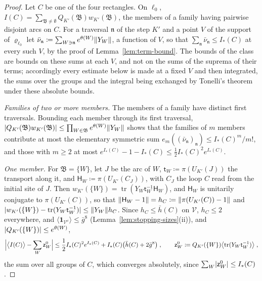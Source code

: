 \documentclass[11pt]{preprint}
\newcommand{\tr}{\operatorname{tr}}
\DeclarePairedDelimiter{\abs}{\lvert}{\rvert}
\DeclarePairedDelimiter{\norm}{\lVert}{\rVert}
\numberwithin{equation}{section}
\theoremstyle{definition}
\theoremstyle{remark}
\theoremstyle{plain}
\begin{document}
\begin{proof}
Let $C$ be one of the four rectangles. On $\ell_0$, $I(C) = \sum_{\mathfrak B \neq \emptyset}Q_{K'}(\mathfrak B)w_{K'}(\mathfrak B)$, the members of a family having pairwise disjoint arcs on $C$. For a traversal $\mathfrak n$ of the step $K'$ and a point $V$ of the support of $\varrho_{\ell_0}$ let $\bar\nu_{\mathfrak n} \coloneqq \sum_{W \ni \mathfrak n}e^{\theta(W)}\norm{Y_W}$, a function of $V$, so that $\sum_{\mathfrak n}\bar\nu_{\mathfrak n} \leq I_*(C)$ at every such $V$, by the proof of Lemma~\ref{lem:term-bound}. The bounds of the class are bounds on these sums at each $V$, and not on the sums of the suprema of their terms; accordingly every estimate below is made at a fixed $V$ and then integrated, the sums over the groups and the integral being exchanged by Tonelli's theorem under these absolute bounds.

\emph{Families of two or more members.} The members of a family have distinct first traversals. Bounding each member through its first traversal, $\abs{Q_{K'}(\mathfrak B)w_{K'}(\mathfrak B)} \leq \prod_{W \in \mathfrak B}e^{\theta(W)}\norm{Y_W}$ shows that the families of $m$ members contribute at most the elementary symmetric sum $e_m((\bar\nu_{\mathfrak n})_{\mathfrak n}) \leq I_*(C)^m/m!$, and those with $m \geq 2$ at most $e^{I_*(C)} - 1 - I_*(C) \leq \frac12I_*(C)^2e^{I_*(C)}$.

\emph{One member.} For $\mathfrak B = \{ W \}$, let $J$ be the arc of $W$, $\mathsf t_W \coloneqq \pi(U_{K'}(J))$ the transport along it, and $\mathsf H_W \coloneqq \pi(U_{K'}(C_J))$, with $C_J$ the loop $C$ read from the initial site of $J$. Then $w_{K'}(\{ W \}) = \tr(Y_W\mathsf t_W^{-1}\mathsf H_W)$, and $\mathsf H_W$ is unitarily conjugate to $\pi(U_{K'}(C))$, so that $\norm{\mathsf H_W - 1} = h_C \coloneqq \norm{\pi(U_{K'}(C)) - 1}$ and $\abs{w_{K'}(\{ W \}) - \tr(Y_W\mathsf t_W^{-1})} \leq \norm{Y_W}h_C$. Since $h_C \leq \bar h(C)$ on $\mathcal V$, $h_C \leq 2$ everywhere, and $\langle\mathbf 1_{\mathcal V^c}\rangle \leq \bar g^8$ (Lemma~\ref{lem:stopping-sizes}(ii)), and $\abs{Q_{K'}(\{ W \})} \leq e^{\theta(W)}$,
\begin{equation}\label{eq:one-member}
    \Bigl\lvert\bigl\langle I(C)\bigr\rangle - \sum_W\mathsf z^0_W\Bigr\rvert \leq \frac12I_*(C)^2e^{I_*(C)} + I_*(C)\bigl(\bar h(C) + 2\bar g^8\bigr)\;,
    \qquad
    \mathsf z^0_W \coloneqq Q_{K'}(\{ W \})\bigl\langle\tr(Y_W\mathsf t_W^{-1})\bigr\rangle\;,
\end{equation}
the sum over all groups of $C$, which converges absolutely, since $\sum_W\abs{\mathsf z^0_W} \leq I_*(C)$.


\end{proof}
\end{document}
